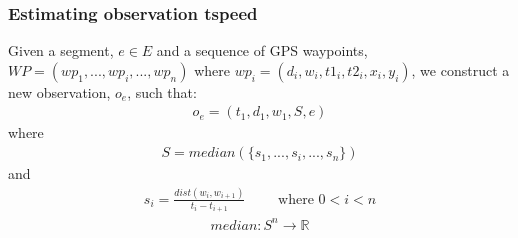 \subsubsection{Estimating observation tspeed}\label{KR:speed}
Given a segment, $e \in E$ and a sequence of GPS waypoints, $WP=(wp_1,...,wp_i,...,wp_n)$ where $wp_i = (d_i, w_i, t1_i, t2_i, x_i, y_i)$, we construct a new observation, $o_e$, such that:
\begin{align*}
o_e = (t_1, d_1, w_1, S, e)
\end{align*}
where
\begin{align*}
S = median(\{s_1,...,s_i,...,s_n\})
\end{align*}
and
\begin{align*}
s_i = \frac{dist(w_i, w_{i+1})}{t_i - t_{i+1}} \qquad \text{ where } 0 < i < n
\end{align*}
\begin{align*}
median: S^n \rightarrow \mathbb{R}
\end{align*}
